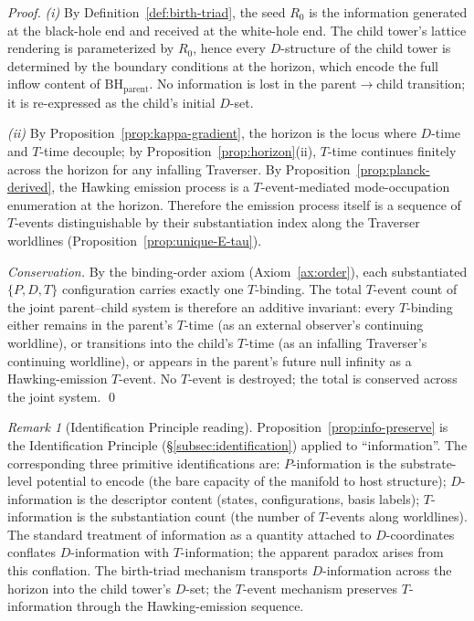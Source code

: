 \documentclass[11pt,a4paper]{article}
\theoremstyle{definition}
\theoremstyle{remark}
\newtheorem{remark}[theorem]{Remark}
\begin{document}
\begin{proof}
\emph{(i)} By Definition~\ref{def:birth-triad}, the seed $R_{0}$ is the information generated at the black-hole end and received at the white-hole end. The child tower's lattice rendering is parameterized by $R_{0}$, hence every $D$-structure of the child tower is determined by the boundary conditions at the horizon, which encode the full inflow content of $\mathrm{BH}_{\text{parent}}$. No information is lost in the parent$\to$child transition; it is re-expressed as the child's initial $D$-set.

\emph{(ii)} By Proposition~\ref{prop:kappa-gradient}, the horizon is the locus where $D$-time and $T$-time decouple; by Proposition~\ref{prop:horizon}(ii), $T$-time continues finitely across the horizon for any infalling Traverser. By Proposition~\ref{prop:planck-derived}, the Hawking emission process is a $T$-event-mediated mode-occupation enumeration at the horizon. Therefore the emission process itself is a sequence of $T$-events distinguishable by their substantiation index along the Traverser worldlines (Proposition~\ref{prop:unique-E-tau}).

\emph{Conservation.} By the binding-order axiom (Axiom~\ref{ax:order}), each substantiated $\{P,D,T\}$ configuration carries exactly one $T$-binding. The total $T$-event count of the joint parent--child system is therefore an additive invariant: every $T$-binding either remains in the parent's $T$-time (as an external observer's continuing worldline), or transitions into the child's $T$-time (as an infalling Traverser's continuing worldline), or appears in the parent's future null infinity as a Hawking-emission $T$-event. No $T$-event is destroyed; the total is conserved across the joint system. \qed
\end{proof}

\begin{remark}[Identification Principle reading]\label{rem:info-identification}
Proposition~\ref{prop:info-preserve} is the Identification Principle (\S\ref{subsec:identification}) applied to ``information''. The corresponding three primitive identifications are: $P$-information is the substrate-level potential to encode (the bare capacity of the manifold to host structure); $D$-information is the descriptor content (states, configurations, basis labels); $T$-information is the substantiation count (the number of $T$-events along worldlines). The standard treatment of information as a quantity attached to $D$-coordinates conflates $D$-information with $T$-information; the apparent paradox arises from this conflation. The birth-triad mechanism transports $D$-information across the horizon into the child tower's $D$-set; the $T$-event mechanism preserves $T$-information through the Hawking-emission sequence.
\end{remark}
\end{document}
